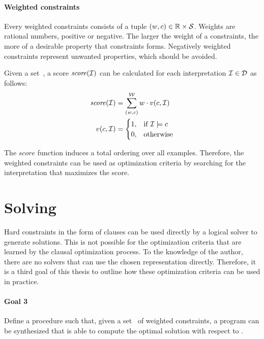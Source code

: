 \paragraph{Weighted constraints}
Every weighted constraints consists of a tuple $(w, c) \in \mathbb{R} \times \mathcal{S}$.
Weights are rational numbers, positive or negative.
The larger the weight of a constraints, the more of a desirable property that constraints forms.
Negatively weighted constraints represent unwanted properties, which should be avoided.

Given a set~, a score $\mathit{score}(\mathcal{I})$ can be calculated for each interpretation $\mathcal{I} \in \mathcal{D}$ as follows:
\begin{align*}
	\mathit{score}(\mathcal{I}) &= \sum\limits_{(w, c)}^{\mathcal{W}} w \cdot v(c, \mathcal{I}) \\
	v(c, \mathcal{I}) &=
	\begin{cases}
		1,& \text{if } \mathcal{I} \models c\\
		0,& \text{otherwise}
	\end{cases}
\end{align*}

The $\mathit{score}$ function induces a total ordering over all examples.
Therefore, the weighted constraints  can be used as optimization criteria by searching for the interpretation that maximizes the score.

\section{Solving}
Hard constraints in the form of clauses can be used directly by a logical solver to generate solutions.
This is not possible for the optimization criteria that are learned by the clausal optimization process.
To the knowledge of the author, there are no solvers that can use the chosen representation directly.
Therefore, it is a third goal of this thesis to outline how these optimization criteria can be used in practice.

\begin{framed}
	\noindent
	\begin{minipage}{\textwidth}
	\paragraph{Goal 3}
	Define a procedure such that, given a set~ of weighted constraints, a program can be synthesized that is able to compute the optimal solution with respect to .
	\end{minipage}
\end{framed}
